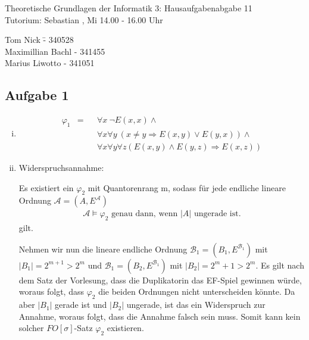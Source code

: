 \documentclass[a4paper,10pt]{article}
\begin{document}
\begin{center}
\Large{Theoretische Grundlagen der Informatik 3: Hausaufgabenabgabe 11} \\
\large{Tutorium: Sebastian , Mi 14.00 - 16.00 Uhr}
\end{center}
\begin{tabbing}
Tom Nick \hspace{2cm}\= - 340528\\
Maximillian Bachl \> - 341455 \\
Marius Liwotto\> -  341051
\end{tabbing}
\subsection*{Aufgabe 1}
	\begin{enumerate}[(i)]
		\item 
			\begin{align*}
				\varphi_1 &= &&\forall x~ \neg E(x,x) \wedge \\
				&&&\forall x \forall y~ 
				(x \neq y \Rightarrow E(x,y) \vee E(y,x)) \wedge  \\
				&&&\forall x \forall y \forall z (E(x,y) \wedge E(y,z) \Rightarrow E(x,z))
			\end{align*}
			
		\item
			Widerspruchsannahme:
			
			Es existiert ein $\varphi_2$ mit Quantorenrang m, sodass für jede endliche lineare Ordnung $\mathcal{A} = (A,E^{\mathcal{A}})$ 
			\begin{align*}
				\mathcal{A} \vDash \varphi_2 \text{ genau dann, wenn $|A|$ ungerade ist.}
			\end{align*}
			gilt.
			
			Nehmen wir nun die lineare endliche Ordnung $\mathcal{B}_1 = (B_1,E^{\mathcal{B}_1})$ mit $|B_1| = 2^{m+1} > 2^m$ und $\mathcal{B}_1 			= (B_2,E^{\mathcal{B}_1})$ mit $|B_2| = 2^m + 1 > 2^m$. Es gilt nach dem Satz der Vorlesung, dass die Duplikatorin das EF-Spiel 					gewinnen würde, woraus folgt, dass $\varphi_2$ die beiden Ordnungen nicht unterscheiden könnte. Da aber $|B_1|$ gerade ist und $|					B_2|$ ungerade, ist das ein Widerspruch zur Annahme, woraus folgt, dass die Annahme falsch sein muss. Somit kann 									kein solcher $FO[\sigma]$-Satz $\varphi_2$ existieren. 
				
	\end{enumerate}
\end{document}
